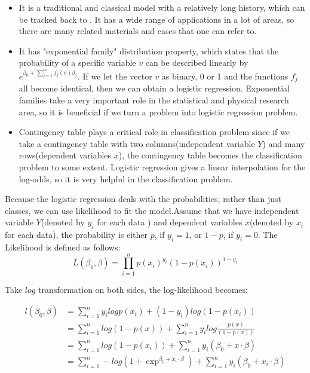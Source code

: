 \begin{itemize}
	\item It is a traditional and classical model with a relatively long history,  which can be tracked back to \cite{bliss1934method}. It has a wide range of applications in a lot of areas,  so there are many related materials and cases that one can refer to. 
	\item It has "exponential family" distribution property,  which states that the probability of a specific variable $v$ can be described linearly by $e^{\beta_0+\sum_{j=1}^{m}f_j(v)\beta_j}$. If we let the vector $v$ as binary,  0 or 1 and the functions $f_j$ all become identical,  then we can obtain a logistic regression. Exponential families take a very important role in the statistical and physical research area,  so it is beneficial if we turn a problem into logistic regression problem.  
	\item Contingency table plays a critical role in classification problem since if we take a contingency table with two columns(independent variable $Y$) and many rows(dependent variables $x$),  the contingency table becomes the classification problem to some extent. Logistic regression gives a linear interpolation for the log-odds,  so it is very helpful in the classification problem.  

\end{itemize}

Because the logistic regression deals with the probabilities,  rather than just classes,  we can use likelihood to fit the model.Assume that we have independent variable $Y$(denoted by $y_i$ for each data ) and dependent variables $x$(denoted by $x_i$ for each data),  the probability is either $p$,  if $y_i=1$,  or $1-p$,  if $y_i=0$. The Likelihood is defined as follows: 
\begin{equation}\label{en: likelihood}
L(\beta_0, \beta)=\prod_{i=1}^{n}p(x_i)^{y_i}(1-p(x_i))^{1-y_i}
\end{equation}

Take $log$ transformation on both sides,  the log-likelihood becomes: 

\begin{equation}\label{en: log-likelihood}
\begin{aligned}
l(\beta_0, \beta)&=\sum_{i=1}^{n}y_i logp(x_i)+(1-y_i)log(1-p(x_i))\\
&=\sum_{i=1}^{n}log(1-p(x))+\sum_{i=1}^{n}y_ilog\frac{p(x)}{(1-p(x))}\\
&=\sum_{i=1}^{n}log(1-p(x_i))+\sum_{i=1}^{n}y_i(\beta_0+x\cdot \beta)\\
&=\sum_{i=1}^{n}-log(1+\exp^{\beta_0+x_i\cdot \beta})+ \sum_{i=1}^{n}y_i(\beta_0+x_i\cdot\beta)
\end{aligned}
\end{equation}

